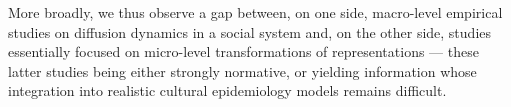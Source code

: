 \smallskip
More broadly, we thus observe a gap between, on one side, macro-level empirical studies on diffusion dynamics in a social system and, on the other side, studies essentially focused on micro-level transformations of representations --- these latter studies being either strongly normative, or yielding information whose integration into realistic cultural epidemiology models remains difficult. %






